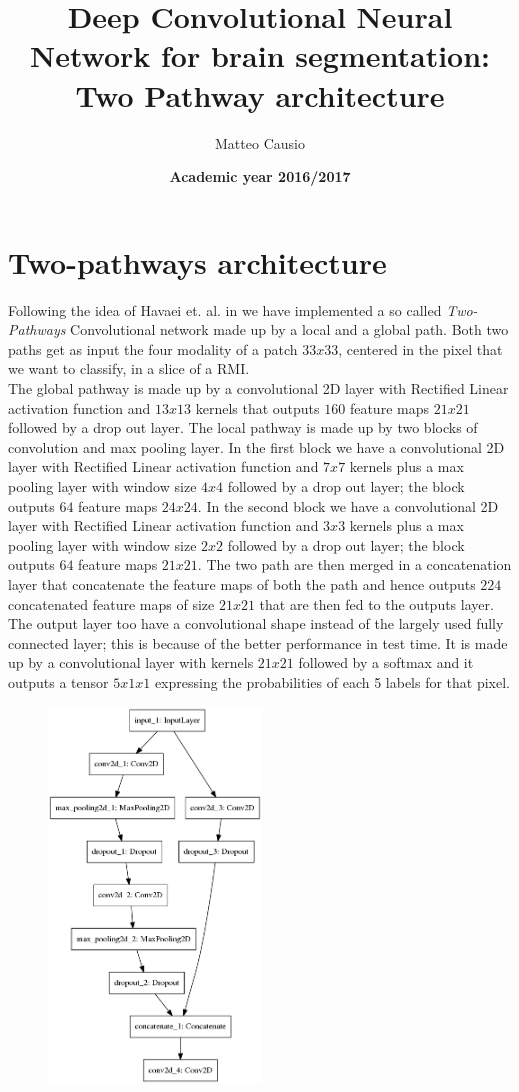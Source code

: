\documentclass[openany,12pt,english]{book}
\title{Deep Convolutional Neural Network for brain segmentation: Two Pathway architecture}
\author{Matteo Causio} %
\date{\textbf{Academic year 2016/2017}}
\begin{document}
	
	\maketitle
	\tableofcontents
	\thispagestyle{empty}
	\newpage
	\chapter{Two-pathways architecture}
	Following the idea of Havaei et. al. in \cite{HAV17} we have implemented a so called \emph{Two-Pathways} Convolutional network made up by a local and a global path. Both two paths get as input the four modality of a patch $33x33$, centered in the pixel that we want to classify, in a slice of a RMI.\\
	The global pathway is made up by a convolutional 2D layer with Rectified Linear activation function and $13x13$ kernels that outputs $160$ feature maps $21x21$ followed by a drop out layer.
	The local pathway is made up by two blocks of convolution and max pooling layer. In the first block we have a convolutional 2D layer with Rectified Linear activation function and $7x7$ kernels plus a max pooling layer with window size $4x4$ followed by a drop out layer; the block outputs $64$ feature maps $24x24$. In the second block we have a convolutional 2D layer with Rectified Linear activation function and $3x3$ kernels plus a max pooling layer with window size $2x2$ followed by a drop out layer; the block outputs $64$ feature maps $21x21$.
	The two path are then merged in a concatenation layer that concatenate the feature maps of both the path and hence outputs  $224$ concatenated feature maps of size $21x21$ that are then fed to the outputs layer.
	The output layer too have a convolutional shape instead of the largely used fully connected layer; this is because of the better performance in test time.
	It is made up by a convolutional layer with kernels $21x21$ followed by a softmax and it outputs a tensor $5x1x1$ expressing the probabilities of each 5 labels for that pixel.
	\begin{figure}[htbp]
		\centering
		\includegraphics[height=10cm,keepaspectratio]{singleTwoPathModel.png}
		\caption{\label{fig:singleTwoPathModel}}
	\end{figure}
\end{document}
